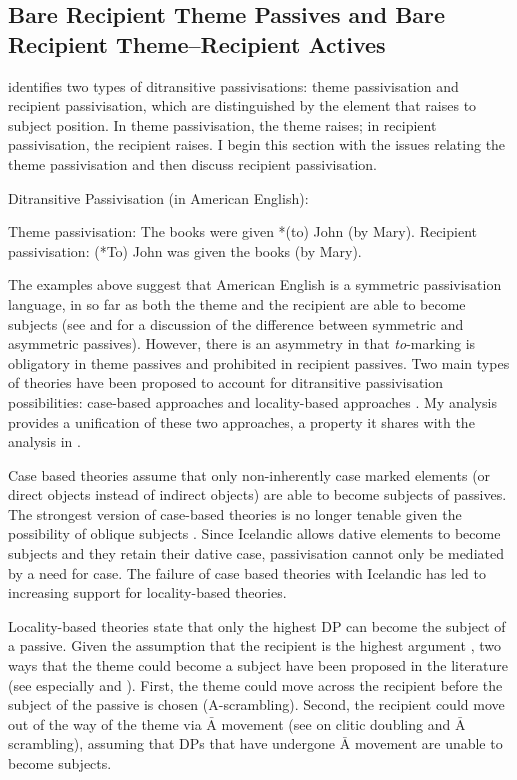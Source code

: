 {\subsection{Bare Recipient Theme Passives and Bare Recipient Theme--Recipient Actives}
\cite{Allen.1999} identifies two types of ditransitive passivisations: theme passivisation and recipient passivisation, which are distinguished by the element that raises to subject position. In theme passivisation, the theme raises; in recipient passivisation, the recipient raises. I begin this section with the issues relating the theme passivisation and then discuss recipient passivisation.
\begin{exe}
\ex Ditransitive Passivisation (in American English):
\begin{xlist}
\ex Theme passivisation: The books were given *(to) John (by Mary).
\ex Recipient passivisation: (*To) John was given the books (by Mary).
\end{xlist}
\end{exe}%
The examples above suggest that American English is a symmetric passivisation language, in so far as both the theme and the recipient are able to become subjects (see \cite{Woolford.1993} and \cite{Anagnostopoulou.2003} for a discussion of the difference between symmetric and asymmetric passives). However, there is an asymmetry in that \textit{to}-marking is obligatory in theme passives and prohibited in recipient passives. Two main types of theories have been proposed to account for ditransitive passivisation possibilities: case-based approaches \citep{Larson.1988,Baker.1988,Pesetsky.1996,Holmberg.2001} and locality-based approaches \citep{Falk.1990,Holmberg.1995,McGinnis.1998,Anagnostopoulou.2003}. My analysis provides a unification of these two approaches, a property it shares with the analysis in \cite{Platzack.2005}. 

Case based theories assume that only non-inherently case marked elements (or direct objects instead of indirect objects) are able to become subjects of passives. The strongest version of case-based theories is no longer tenable given the possibility of oblique subjects \citep{Zaenen.1985}. Since Icelandic allows dative elements to become subjects and they retain their dative case, passivisation cannot only be mediated by a need for case. The failure of case based theories with Icelandic has led to increasing support for locality-based theories. 

Locality-based theories state that only the highest DP can become the subject of a passive. Given the assumption that the recipient is the highest argument \citep{Georgala.2011}, two ways that the theme could become a subject have been proposed in the literature (see especially \cite{McGinnis.2001} and \cite{Anagnostopoulou.2003}). First, the theme could move across the recipient before the subject of the passive is chosen (A-scrambling). Second, the recipient could move out of the way of the theme via $\bar{\text{A}}$ movement (see \cite{Anagnostopoulou.2003} on clitic doubling and $\bar{\text{A}}$ scrambling), assuming that DPs that have undergone $\bar{\text{A}}$ movement are unable to become subjects. 

}

